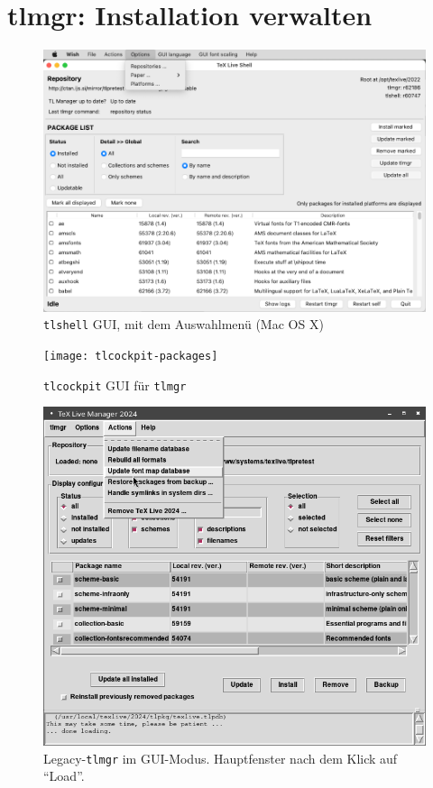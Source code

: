\documentclass[12pt,ngerman,a4paper,fullparskip]{report}
\newcommand{\prog}[1]{\texttt{#1}}
\begin{document}
\chapter{tlmgr: Installation verwalten}\label{sec:tlmgr}

\begin{figure}[tb]
\includegraphics[width=\linewidth]{tlshell-macos}
\caption{\prog{tlshell} GUI, mit dem Auswahlmenü (Mac OS X)}
\label{fig:tlshell}
\end{figure}

\begin{figure}[tb]
\texttt{[image: tlcockpit-packages]}
\caption{\prog{tlcockpit} GUI für \prog{tlmgr}}
\label{fig:tlcockpit}
\end{figure}

\begin{figure}[tb]
\includegraphics[width=\linewidth]{tlmgr-gui}
\caption{Legacy-\prog{tlmgr} im GUI-Modus. Hauptfenster nach dem Klick auf \enquote{Load}.}\label{fig:tlmgr-gui}
\end{figure}
\end{document}
